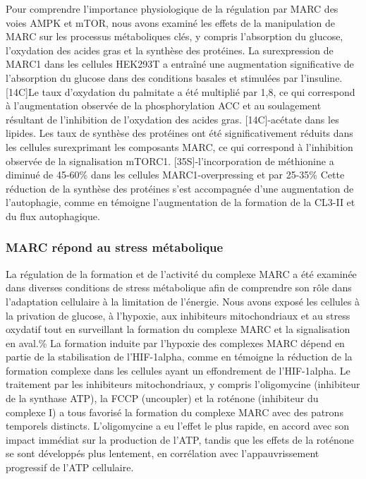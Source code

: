\documentclass[11pt,a4paper]{article}
\begin{document}
Pour comprendre l'importance physiologique de la régulation par MARC des voies AMPK et mTOR, nous avons examiné les effets de la manipulation de MARC sur les processus métaboliques clés, y compris l'absorption du glucose, l'oxydation des acides gras et la synthèse des protéines. La surexpression de MARC1 dans les cellules HEK293T a entraîné une augmentation significative de l'absorption du glucose dans des conditions basales et stimulées par l'insuline. [14C]Le taux d'oxydation du palmitate a été multiplié par 1,8, ce qui correspond à l'augmentation observée de la phosphorylation ACC et au soulagement résultant de l'inhibition de l'oxydation des acides gras. [14C]-acétate dans les lipides. Les taux de synthèse des protéines ont été significativement réduits dans les cellules surexprimant les composants MARC, ce qui correspond à l'inhibition observée de la signalisation mTORC1. [35S]-l'incorporation de méthionine a diminué de 45-60\% dans les cellules MARC1-overpressing et par 25-35\% Cette réduction de la synthèse des protéines s'est accompagnée d'une augmentation de l'autophagie, comme en témoigne l'augmentation de la formation de la CL3-II et du flux autophagique.

\subsubsection{MARC répond au stress métabolique}

La régulation de la formation et de l'activité du complexe MARC a été examinée dans diverses conditions de stress métabolique afin de comprendre son rôle dans l'adaptation cellulaire à la limitation de l'énergie. Nous avons exposé les cellules à la privation de glucose, à l'hypoxie, aux inhibiteurs mitochondriaux et au stress oxydatif tout en surveillant la formation du complexe MARC et la signalisation en aval.\% La formation induite par l'hypoxie des complexes MARC dépend en partie de la stabilisation de l'HIF-1alpha, comme en témoigne la réduction de la formation complexe dans les cellules ayant un effondrement de l'HIF-1alpha. Le traitement par les inhibiteurs mitochondriaux, y compris l'oligomycine (inhibiteur de la synthase ATP), la FCCP (uncoupler) et la roténone (inhibiteur du complexe I) a tous favorisé la formation du complexe MARC avec des patrons temporels distincts. L'oligomycine a eu l'effet le plus rapide, en accord avec son impact immédiat sur la production de l'ATP, tandis que les effets de la roténone se sont développés plus lentement, en corrélation avec l'appauvrissement progressif de l'ATP cellulaire.
\end{document}
